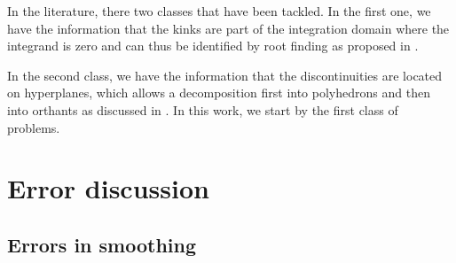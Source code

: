 \documentclass[11pt]{article}
\begin{document}
In the literature, there two classes that have been tackled. In the first one, we have the information that the kinks are  part of the integration domain where the integrand is zero and can thus be identified by root finding as proposed in \cite{gerstner2007sparse}.

In the second class, we have the information that the discontinuities are located on hyperplanes, which allows a decomposition first into polyhedrons and then into
orthants as discussed in \cite{gerstner2008valuation}. In this work, we start by the first  class of problems.





\section{Error discussion}\label{sec:Error discussion}





\subsection{Errors in smoothing}
\label{sec:errors-smoothing}
\end{document}
